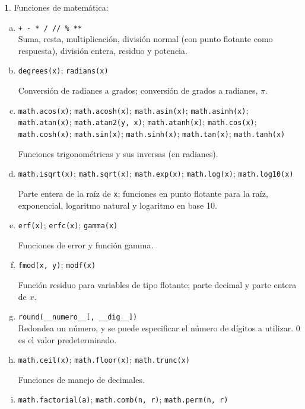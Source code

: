 \documentclass[12pt]{article}
\theoremstyle{definition}
\newtheorem{funcion}{}[section]
\begin{document}
\begin{funcion}
  Funciones de matemática:
  \begin{enumerate}[a)]
    \item \verb|+ - * / // % **| \\[1ex]
  Suma, resta, multiplicación, división normal (con punto flotante como respuesta), división entera, residuo y potencia.

    \item \verb|degrees(x)|; \verb|radians(x)|

      Conversión de radianes a grados; conversión de grados a radianes, $\pi$.

\item \verb|math.acos(x)|;
      \verb|math.acosh(x)|;
      \verb|math.asin(x)|;
      \verb|math.asinh(x)|;
      \verb|math.atan(x)|;
      \verb|math.atan2(y, x)|;
      \verb|math.atanh(x)|;
      \verb|math.cos(x)|;
      \verb|math.cosh(x)|;
      \verb|math.sin(x)|;
      \verb|math.sinh(x)|;
      \verb|math.tan(x)|;
      \verb|math.tanh(x)|

      Funciones trigonométricas y sus inversas (en radianes).

\item \verb|math.isqrt(x)|; \verb|math.sqrt(x)|; \verb|math.exp(x)|; \verb|math.log(x)|; \verb|math.log10(x)|

  Parte entera de la raíz de \verb|x|; funciones en punto flotante para la raíz, exponencial, logaritmo natural y logaritmo en base 10.

    \item \verb|erf(x)|; \verb|erfc(x)|; \verb|gamma(x)|

      Funciones de error y función gamma.

    \item \verb|fmod(x, y)|; \verb|modf(x)|
      
      Función residuo para variables de tipo flotante; parte decimal y parte entera de $x$.

\item \verb|round(__numero__[, __dig__])| \\[1ex]
  Redondea un número, y se puede especificar el número de dígitos a utilizar. 0 es el valor predeterminado.

    \item \verb|math.ceil(x)|;
      \verb|math.floor(x)|;
      \verb|math.trunc(x)|

      Funciones de manejo de decimales.

    \item \verb|math.factorial(a)|; \verb|math.comb(n, r)|; \verb|math.perm(n, r)|


\end{enumerate}
\end{funcion}
\end{document}
